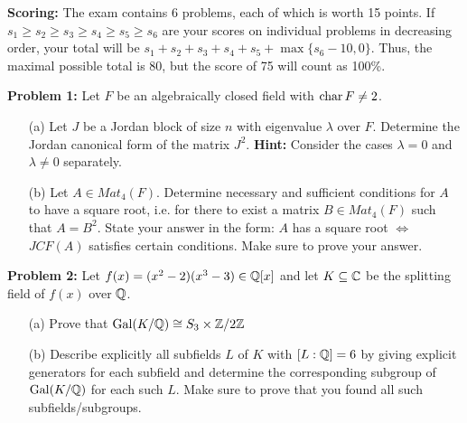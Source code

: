 \documentclass[12pt]{amsart}
\begin{document}
\skv
{\bf Scoring:} The exam contains 6 problems, each of which is worth 15 points. If $s_1\geq s_2\geq s_3\geq s_4\geq s_5\geq s_6$ are
your scores on individual problems in decreasing order, your total will be $s_1+s_2+s_3+s_4+s_5+\max\{s_6-10,0\}$. Thus, the maximal
possible total is 80, but the score of 75 will count as 100\%.


\skv

{\bf Problem 1: } Let $F$ be an algebraically closed field with ${\rm char}\, {F}\neq 2$. 
\begin{enumerate}
\item[(a)] Let $J$ be a Jordan block of size $n$ with eigenvalue $\lambda$ over $F$. Determine the Jordan canonical form of the matrix $J^2$. {\bf Hint: } Consider the cases $\lambda=0$ and $\lambda\neq 0$ separately.  
\item[(b)] Let $A\in Mat_4(F)$. Determine necessary and sufficient conditions for $A$ to have a square root, i.e. for there to exist a matrix $B\in Mat_4(F)$ such that $A=B^2$. State your answer in the form: $A$ has a square root $\iff$ $JCF(A)$ satisfies certain conditions. Make sure to prove your answer. 
\end{enumerate}

\skv
{\bf Problem 2: } Let $f(x)=(x^2-2)(x^3-3)\in{\mathbb Q}[x]$ and let $K\subseteq {\mathbb C}$  be the splitting field of $f(x)$ over ${\mathbb Q}$.
\begin{itemize}
\item[(a)] Prove that ${\rm Gal}(K/{\mathbb Q})\cong S_3\times {\mathbb Z}/2{\mathbb Z}$
\item[(b)] Describe explicitly all subfields $L$ of $K$ with $[L:{\mathbb Q}]=6$ by giving explicit generators for each subfield and determine the corresponding subgroup of ${\rm Gal}(K/{\mathbb Q})$ for each such $L$. Make sure to prove that you found all such subfields/subgroups.
\end{itemize}
\end{document}
